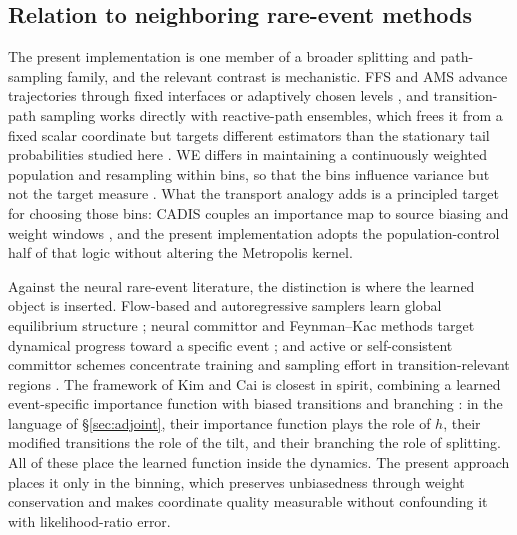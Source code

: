 \documentclass[a4paper,fleqn]{cas-sc}
\begin{document}
\subsection{Relation to neighboring rare-event methods}\label{sec:relation}
The present implementation is one member of a broader splitting and path-sampling family, and
the relevant contrast is mechanistic. FFS and AMS advance trajectories through fixed interfaces
or adaptively chosen levels \citep{allen2009,valeriani2007,cerou2007}, and transition-path
sampling works directly with reactive-path ensembles, which frees it from a fixed scalar
coordinate but targets different estimators than the stationary tail probabilities studied here
\citep{chandler1978,dellago1998,bolhuis2002}. WE differs in maintaining a continuously weighted
population and resampling within bins, so that the bins influence variance but not the target
measure \citep{huber1996,zhang2010,zuckerman2017}. What the transport analogy adds is a
principled target for choosing those bins: CADIS couples an importance map to source biasing and
weight windows \citep{wagner1998,haghighat2003,wagnerfw2014}, and the present implementation
adopts the population-control half of that logic without altering the Metropolis kernel.

Against the neural rare-event literature, the distinction is where the learned object is
inserted. Flow-based and autoregressive samplers learn global equilibrium structure
\citep{wu2019,noe2019,nicoli2020,gabrie2022}; neural committor and Feynman--Kac methods target
dynamical progress toward a specific event \citep{khoo2019,li2022,strahan2023}; and active or
self-consistent committor schemes concentrate training and sampling effort in transition-relevant
regions \citep{rotskoff2022,kang2024,trizio2025}. The framework of Kim and Cai is closest in
spirit, combining a learned event-specific importance function with biased transitions and
branching \citep{kimcai2026}: in the language of \S\ref{sec:adjoint}, their importance function
plays the role of $h$, their modified transitions the role of the tilt, and their branching the
role of splitting. All of these place the learned function inside the dynamics. The present
approach places it only in the binning, which preserves unbiasedness through weight conservation
and makes coordinate quality measurable without confounding it with likelihood-ratio error.
\end{document}
